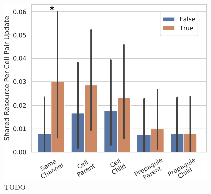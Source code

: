 \begin{figure}
  \begin{columns}
  \begin{column}{0.7\textwidth}
  \includegraphics[width=\textwidth]{img/channelsense-yes__nlev-two+title=resource_contributed+ext=}
  \end{column}
  \begin{column}{0.3\textwidth}
  \caption{
  TODO
  }
  \label{fig:sharing}
  \end{column}
  \end{columns}
\end{figure}
